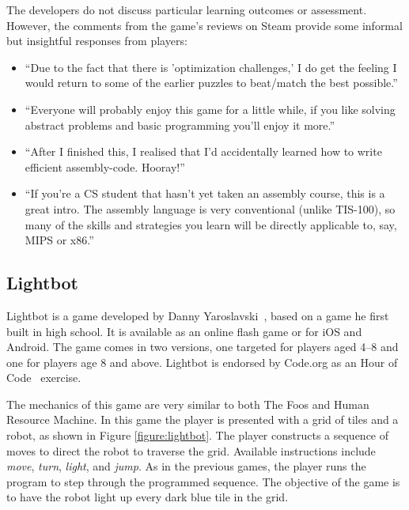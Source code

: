 \documentclass{sig-alternate-05-2015}
\begin{document}
The developers do not discuss particular learning outcomes or assessment. However, the comments from the game's reviews on Steam provide some informal but insightful responses from players:

\begin{itemize}
\item ``Due to the fact that there is 'optimization challenges,' I do get the feeling I would return to some of the earlier puzzles to beat/match the best possible.''
\item ``Everyone will probably enjoy this game for a little while, if you like solving abstract problems and basic programming you'll enjoy it more.''
\item ``After I finished this, I realised that I'd accidentally learned how to write efficient assembly-code. Hooray!''
\item ``If you're a CS student that hasn't yet taken an assembly course, this is a great intro. The assembly language is very conventional (unlike TIS-100), so many of the skills and strategies you learn will be directly applicable to, say, MIPS or x86.''
\end{itemize}
\subsection{Lightbot}


Lightbot is a game developed by Danny Yaroslavski~\cite{openfl}, based on a game he first built in high school. It is available as an online flash game or for iOS and Android. The game comes in two versions, one targeted for players aged 4--8 and one for players age 8 and above. Lightbot is endorsed by Code.org as an Hour of Code~\cite{codeorg} exercise.



The mechanics of this game are very similar to both The Foos and Human Resource Machine. In this game the player is presented with a grid of tiles and a robot, as shown in Figure \ref{figure:lightbot}. The player constructs a sequence of moves to direct the robot to traverse the grid. Available instructions include {\em move}, {\em turn}, {\em light}, and {\em jump}. As in the previous games, the player runs the program to step through the programmed sequence. The objective of the game is to have the robot light up every dark blue tile in the grid.
\end{document}
